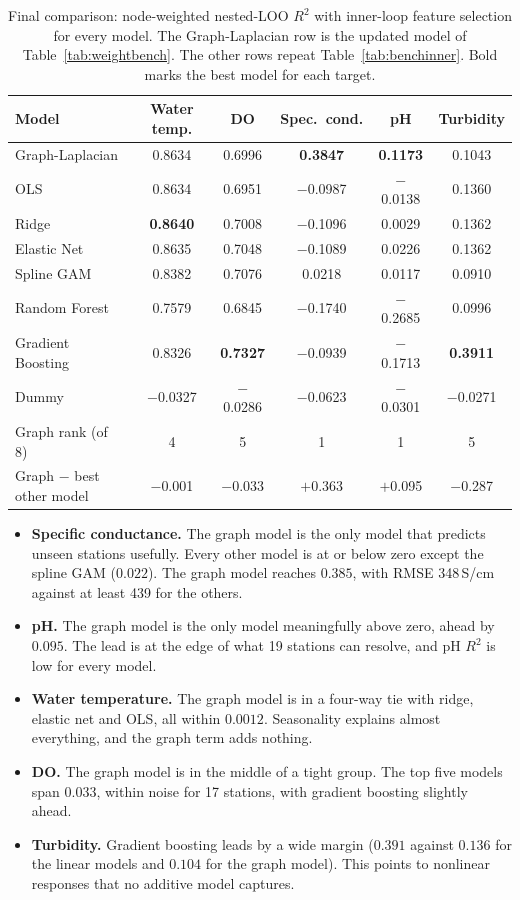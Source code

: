 \documentclass[11pt]{article}
\begin{document}
\begin{table}[h]
\centering
\small
\caption{Final comparison: node-weighted nested-LOO $R^2$ with inner-loop feature selection for every
model. The Graph-Laplacian row is the updated model of Table~\ref{tab:weightbench}. The other rows
repeat Table~\ref{tab:benchinner}. Bold marks the best model for each target.}
\label{tab:final}
\begin{tabular}{l c c c c c}
\toprule
Model & {Water temp.} & {DO} & {Spec.\ cond.} & {pH} & {Turbidity} \\
\midrule
Graph-Laplacian    & 0.8634 & 0.6996 & \textbf{0.3847} & \textbf{0.1173} & 0.1043 \\
OLS                & 0.8634 & 0.6951 & $-$0.0987 & $-$0.0138 & 0.1360 \\
Ridge              & \textbf{0.8640} & 0.7008 & $-$0.1096 & 0.0029 & 0.1362 \\
Elastic Net        & 0.8635 & 0.7048 & $-$0.1089 & 0.0226 & 0.1362 \\
Spline GAM         & 0.8382 & 0.7076 & 0.0218 & 0.0117 & 0.0910 \\
Random Forest      & 0.7579 & 0.6845 & $-$0.1740 & $-$0.2685 & 0.0996 \\
Gradient Boosting  & 0.8326 & \textbf{0.7327} & $-$0.0939 & $-$0.1713 & \textbf{0.3911} \\
Dummy              & $-$0.0327 & $-$0.0286 & $-$0.0623 & $-$0.0301 & $-$0.0271 \\
\midrule
Graph rank (of 8)          & 4 & 5 & 1 & 1 & 5 \\
Graph $-$ best other model & $-$0.001 & $-$0.033 & $+$0.363 & $+$0.095 & $-$0.287 \\
\bottomrule
\end{tabular}
\end{table}

\begin{itemize}
  \item \textbf{Specific conductance.} The graph model is the only model that predicts unseen stations
        usefully. Every other model is at or below zero except the spline GAM ($0.022$). The graph
        model reaches $0.385$, with RMSE 348\,\textmu S/cm against at least 439 for the others.
  \item \textbf{pH.} The graph model is the only model meaningfully above zero, ahead by $0.095$. The
        lead is at the edge of what 19 stations can resolve, and pH $R^2$ is low for every model.
  \item \textbf{Water temperature.} The graph model is in a four-way tie with ridge, elastic net and OLS,
        all within $0.0012$. Seasonality explains almost everything, and the graph term adds
        nothing.
  \item \textbf{DO.} The graph model is in the middle of a tight group. The top five models span
        $0.033$, within noise for 17 stations, with gradient boosting slightly ahead.
  \item \textbf{Turbidity.} Gradient boosting leads by a wide margin ($0.391$ against $0.136$ for the
        linear models and $0.104$ for the graph model). This points to nonlinear responses that no
        additive model captures.
\end{itemize}
\end{document}
